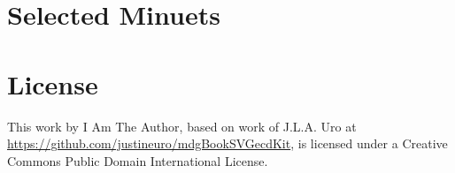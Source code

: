 \documentclass[letterpaper,x11names,svgnames,10pt]{article}
\begin{document}
\newpage
\section{Selected Minuets}
\vspace{-0.20in}
{
\topmargin -0.75in
\textheight 9.15in
	
}	

\newpage
\section{License}
This work by I Am The Author, based on work of J.L.A. Uro at \url{https://github.com/justineuro/mdgBookSVGecdKit}, is licensed under a Creative Commons Public Domain International License.




 
\end{document}
